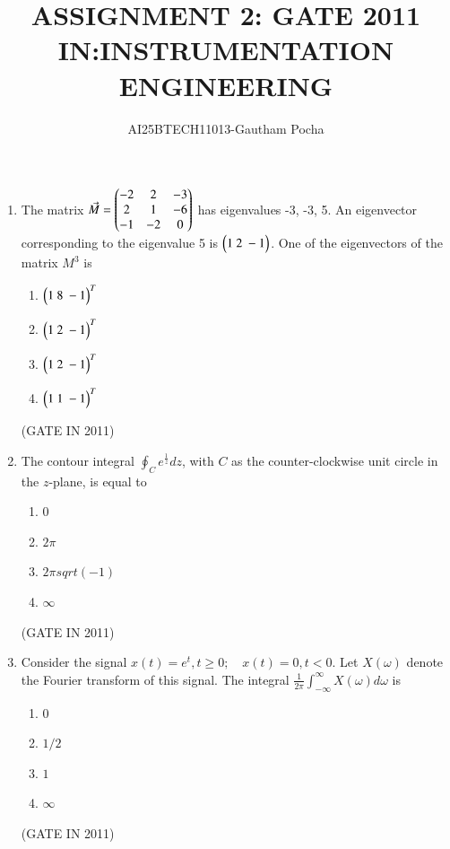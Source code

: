 \documentclass[journal]{IEEEtran}
\begin{document}
\title{
ASSIGNMENT 2: GATE 2011 \\
IN:INSTRUMENTATION ENGINEERING}
\author{AI25BTECH11013-Gautham Pocha}
\maketitle
\renewcommand{\thefigure}{\theenumi}
\renewcommand{\thetable}{\theenumi}


\begin{enumerate}

\item The matrix $ \Vec{M} = \begin{pmatrix}-2 & 2 & -3 \\ 2 & 1 & -6 \\ -1 & -2 & 0 \end{pmatrix} $ has eigenvalues -3, -3, 5. An eigenvector corresponding to the eigenvalue 5 is $\begin{pmatrix}1\ 2\ -1\end{pmatrix}$. One of the eigenvectors of the matrix $ M^3 $ is
\begin{multicols}{4}
\begin{enumerate}
\item $\begin{pmatrix}1\ 8\ -1\end{pmatrix}^T$
\item $\begin{pmatrix}1\ 2\ -1\end{pmatrix}^T$
\item $\begin{pmatrix}1\ 2\ -1\end{pmatrix}^T$
\item $\begin{pmatrix}1\ 1\ -1\end{pmatrix}^T$
\end{enumerate}
\end{multicols} \hfill(GATE IN 2011)

\item The contour integral $ \oint_C e^\frac{1}{z} dz $, with $ C $ as the counter-clockwise unit circle in the $ z $-plane, is equal to
\begin{multicols}{4}
\begin{enumerate}
\item $0$
\item $2\pi$
\item $2\pi sqrt(-1)$
\item $\infty$
\end{enumerate}
\end{multicols} \hfill(GATE IN 2011)

\item Consider the signal $ x(t) = e^t,  t \geq 0; \quad x(t) = 0, t < 0 $. Let $ X(\omega) $ denote the Fourier transform of this signal. The integral $ \frac{1}{2\pi}\int_{-\infty}^{\infty} X(\omega) d\omega $ is
\begin{multicols}{4}
\begin{enumerate}
\item $0$
\item $1/2$
\item $1$
\item $\infty$
\end{enumerate}
\end{multicols} \hfill(GATE IN 2011)


\end{enumerate}
\end{document}
